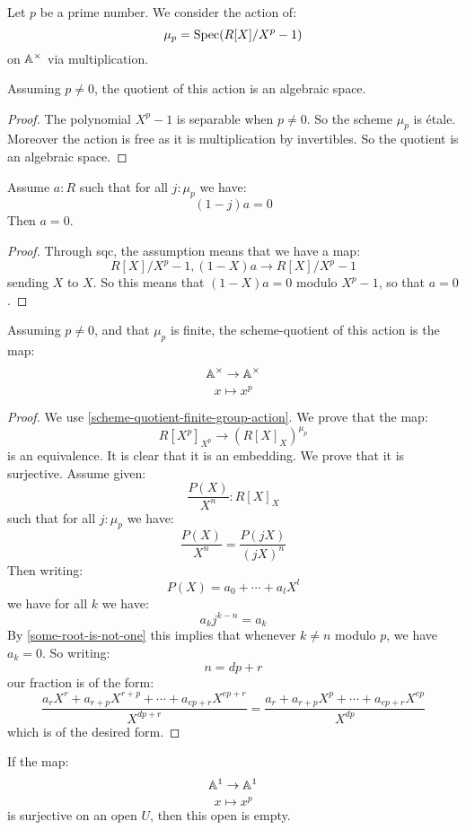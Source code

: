 Let $p$ be a prime number. We consider the action of:
\[\mu_p = \operatorname{Spec}(R[X]/X^p-1)\]
on $\mathbb{A}^\times$ via multiplication.

\begin{lemma}\label{quotient-is-algebraic-space}
Assuming $p\not=0$, the quotient of this action is an algebraic space.
\end{lemma}

\begin{proof}
The polynomial $X^p-1$ is separable when $p\not=0$. So the scheme $\mu_p$ is étale. Moreover the action is free as it is multiplication by invertibles. So the quotient is an algebraic space.
\end{proof}

\begin{lemma}\label{some-root-is-not-one}
Assume $a:R$ such that for all $j:\mu_p$ we have:
\[(1-j)a = 0\]
Then $a=0$.
\end{lemma}

\begin{proof}
Through sqc, the assumption means that we have a map:
\[R[X]/X^p-1,(1-X)a \to R[X]/X^p-1\]
sending $X$ to $X$. So this means that $(1-X)a = 0$ modulo $X^p-1$, so that $a=0$.
\end{proof}

\begin{lemma}\label{scheme-quotient-Ax-mup}
Assuming $p\not=0$, and that $\mu_p$ is finite, the scheme-quotient of this action is the map:
\[\mathbb{A}^\times \to \mathbb{A}^\times\]
\[x\mapsto x^p\]
\end{lemma}

\begin{proof}
We use \cref{scheme-quotient-finite-group-action}. We prove that the map:
\[R[X^p]_{X^p} \to (R[X]_X)^{\mu_p} \]
is an equivalence. It is clear that it is an embedding. We prove that it is surjective. Assume given:
\[\frac{P(X)}{X^n} : R[X]_X\]
such that for all $j:\mu_p$ we have:
\[\frac{P(X)}{X^n} = \frac{P(jX)}{(jX)^n} \]
Then writing:
\[P(X) = a_0 + \cdots + a_l X^l\]
we have for all $k$ we have:
\[ a_k j^{k-n} = a_k\]
By \cref{some-root-is-not-one} this implies that whenever $k\not=n$ modulo $p$, we have $a_k=0$. So writing:
\[n = dp + r\]
 our fraction is of the form:
\[\frac{a_rX^r + a_{r+p} X^{r+p} +\cdots + a_{ep + r} X^{ep + r}}{X^{dp+r}} = \frac{a_r + a_{r+p} X^{p} +\cdots + a_{ep + r} X^{ep}}{X^{dp}}\]
which is of the desired form.
\end{proof}

\begin{lemma}\label{no-roots-for-any-p}
If the map:
\[\mathbb{A}^1\to \mathbb{A}^1\]
\[x\mapsto x^p\] 
is surjective on an open $U$, then this open is empty.
\end{lemma}


